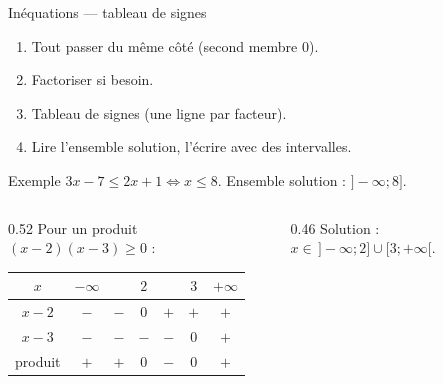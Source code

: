 \documentclass[10pt,aspectratio=169]{beamer}
\numberwithin{dummy}{section}
\begin{document}
\begin{frame}{Inéquations --- tableau de signes}
\begin{boxmethode}
\begin{enumerate}
    \item Tout passer du même côté (second membre $0$).
    \item Factoriser si besoin.
    \item Tableau de signes (une ligne par facteur).
    \item Lire l'ensemble solution, l'écrire avec des intervalles.
\end{enumerate}
\end{boxmethode}

\begin{exampleblock}{Exemple}
$3x-7\leqslant 2x+1 \iff x\leqslant 8$. Ensemble solution : $]{-}\infty;8]$.
\end{exampleblock}

\vspace{0.15em}
\begin{columns}[T]
\begin{column}{0.52\textwidth}
{\small Pour un produit $(x-2)(x-3)\geqslant 0$ :}
\vspace{0.2em}
{\scriptsize
\renewcommand{\arraystretch}{1.2}
\begin{tabular}{|c|cccccc|}
\hline
$x$ & $-\infty$ && $2$ && $3$ & $+\infty$ \\
\hline
$x-2$ & $-$ & $-$ & $0$ & $+$ & $+$ & $+$ \\
$x-3$ & $-$ & $-$ & $-$ & $-$ & $0$ & $+$ \\
\hline
produit & $+$ & $+$ & $0$ & $-$ & $0$ & $+$ \\
\hline
\end{tabular}
}
\end{column}
\begin{column}{0.46\textwidth}
\vspace{0.3em}
Solution : $x\in\,]{-}\infty;2]\cup[3;+\infty[$.
\end{column}
\end{columns}
\end{frame}
\end{document}
